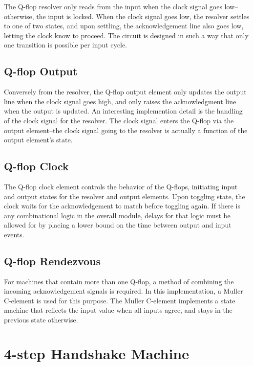 \documentclass[10pt]{article}
\begin{document}
The Q-flop resolver only reads from the input when the clock signal goes low--otherwise, the input is locked. When the clock signal goes low, the resolver settles to one of two states, and upon settling, the acknowledgement line also goes low, letting the clock know to proceed. The circuit is designed in such a way that only one transition is possible per input cycle.

\subsection{Q-flop Output}

Conversely from the resolver, the Q-flop output element only updates the output line when the clock signal goes high, and only raises the acknowledgment line when the output is updated. An interesting implemention detail is the handling of the clock signal for the resolver. The clock signal enters the Q-flop via the output element--the clock signal going to the resolver is actually a function of the output element's state.

\subsection{Q-flop Clock}

The Q-flop clock element controls the behavior of the Q-flops, initiating input and output states for the resolver and output elements. Upon toggling state, the clock waits for the acknowledgement to match before toggling again. If there is any combinational logic in the overall module, delays for that logic must be allowed for by placing a lower bound on the time between output and input events.

\subsection{Q-flop Rendezvous}

For machines that contain more than one Q-flop, a method of combining the incoming acknowledgement signals is required. In this implementation, a Muller C-element \cite{muller} is used for this purpose. The Muller C-element implements a state machine that reflects the input value when all inputs agree, and stays in the previous state otherwise.

\section{4-step Handshake Machine}
\end{document}
